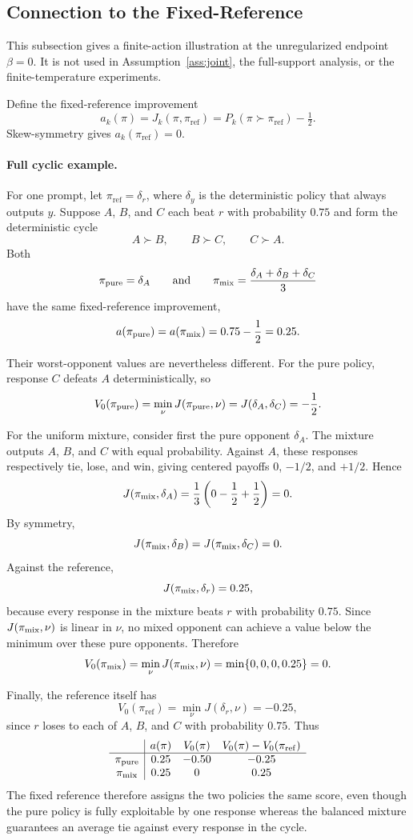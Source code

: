\documentclass{article}
\theoremstyle{remark}
\theoremstyle{plain}
\newcommand{\piref}{\pi_{\mathrm{ref}}}
\begin{document}
\subsection{Connection to the Fixed-Reference}
\label{app:anchor-limit}
This subsection gives a finite-action illustration at the unregularized endpoint $\beta=0$. It is not used in Assumption~\ref{ass:joint}, the full-support analysis, or the finite-temperature experiments.

Define the fixed-reference improvement
\begin{equation}
a_k(\pi)=J_k(\pi,\piref)=P_k(\pi\succ\piref)-\tfrac12.
\label{eq:anchor-margin}
\end{equation}
Skew-symmetry gives $a_k(\piref)=0$.

\paragraph{Full cyclic example.}
For one prompt, let $\piref=\delta_r$, where $\delta_y$ is the deterministic
policy that always outputs $y$. Suppose $A$, $B$, and $C$ each beat $r$
with probability $0.75$ and form the deterministic cycle
\[
A\succ B,\qquad B\succ C,\qquad C\succ A.
\]
Both
\[
\pi_{\rm pure}=\delta_A
\qquad\text{and}\qquad
\pi_{\rm mix}=\frac{\delta_A+\delta_B+\delta_C}{3}
\]
have the same fixed-reference improvement,
\[
a(\pi_{\rm pure})
=
a(\pi_{\rm mix})
=
0.75-\frac12
=
0.25.
\]

Their worst-opponent values are nevertheless different. For the pure
policy, response $C$ defeats $A$ deterministically, so
\[
V_0(\pi_{\rm pure})
=
\min_{\nu} J(\pi_{\rm pure},\nu)
=
J(\delta_A,\delta_C)
=
-\frac12.
\]

For the uniform mixture, consider first the pure opponent $\delta_A$.
The mixture outputs $A$, $B$, and $C$ with equal probability. Against
$A$, these responses respectively tie, lose, and win, giving centered
payoffs $0$, $-1/2$, and $+1/2$. Hence
\[
J(\pi_{\rm mix},\delta_A)
=
\frac13
\left(
0-\frac12+\frac12
\right)
=
0.
\]
By symmetry,
\[
J(\pi_{\rm mix},\delta_B)
=
J(\pi_{\rm mix},\delta_C)
=
0.
\]
Against the reference,
\[
J(\pi_{\rm mix},\delta_r)=0.25,
\]
because every response in the mixture beats $r$ with probability $0.75$.
Since $J(\pi_{\rm mix},\nu)$ is linear in $\nu$, no mixed opponent can
achieve a value below the minimum over these pure opponents. Therefore
\[
V_0(\pi_{\rm mix})
=
\min_{\nu}J(\pi_{\rm mix},\nu)
=
\min\{0,0,0,0.25\}
=
0.
\]

Finally, the reference itself has
\[
V_0(\piref)
=
\min_{\nu}J(\delta_r,\nu)
=
-0.25,
\]
since $r$ loses to each of $A$, $B$, and $C$ with probability $0.75$.
Thus
\[
\begin{array}{c|ccc}
& a(\pi) & V_0(\pi) & V_0(\pi)-V_0(\piref)\\
\hline
\pi_{\rm pure} & 0.25 & -0.50 & -0.25\\
\pi_{\rm mix}  & 0.25 & 0     &  0.25
\end{array}
\]
The fixed reference therefore assigns the two policies the same score,
even though the pure policy is fully exploitable by one response whereas
the balanced mixture guarantees an average tie against every response
in the cycle.
\end{document}
